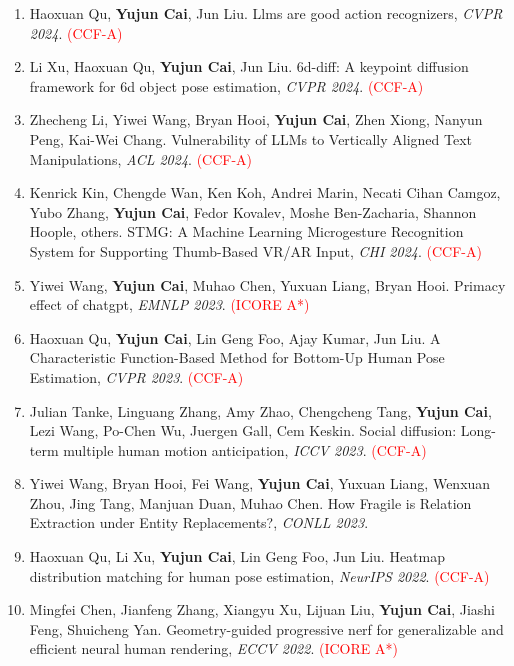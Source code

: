 \documentclass[11pt,letterpaper]{article}
\begin{document}
\begin{enumerate}
\item Haoxuan Qu, \textbf{Yujun Cai}, Jun Liu. Llms are good action recognizers, \textit{CVPR 2024}. \textcolor{red}{(CCF-A)}

\item Li Xu, Haoxuan Qu, \textbf{Yujun Cai}, Jun Liu. 6d-diff: A keypoint diffusion framework for 6d object pose estimation, \textit{CVPR 2024}. \textcolor{red}{(CCF-A)}

\item Zhecheng Li, Yiwei Wang, Bryan Hooi, \textbf{Yujun Cai}, Zhen Xiong, Nanyun Peng, Kai-Wei Chang. Vulnerability of LLMs to Vertically Aligned Text Manipulations, \textit{ACL 2024}. \textcolor{red}{(CCF-A)}

\item Kenrick Kin, Chengde Wan, Ken Koh, Andrei Marin, Necati Cihan Camgoz, Yubo Zhang, \textbf{Yujun Cai}, Fedor Kovalev, Moshe Ben-Zacharia, Shannon Hoople, others. STMG: A Machine Learning Microgesture Recognition System for Supporting Thumb-Based VR/AR Input, \textit{CHI 2024}. \textcolor{red}{(CCF-A)}

\item Yiwei Wang, \textbf{Yujun Cai}, Muhao Chen, Yuxuan Liang, Bryan Hooi. Primacy effect of chatgpt, \textit{EMNLP 2023}. \textcolor{red}{(ICORE A*)}

\item Haoxuan Qu, \textbf{Yujun Cai}, Lin Geng Foo, Ajay Kumar, Jun Liu. A Characteristic Function-Based Method for Bottom-Up Human Pose Estimation, \textit{CVPR 2023}. \textcolor{red}{(CCF-A)}

\item Julian Tanke, Linguang Zhang, Amy Zhao, Chengcheng Tang, \textbf{Yujun Cai}, Lezi Wang, Po-Chen Wu, Juergen Gall, Cem Keskin. Social diffusion: Long-term multiple human motion anticipation, \textit{ICCV 2023}. \textcolor{red}{(CCF-A)}

\item Yiwei Wang, Bryan Hooi, Fei Wang, \textbf{Yujun Cai}, Yuxuan Liang, Wenxuan Zhou, Jing Tang, Manjuan Duan, Muhao Chen. How Fragile is Relation Extraction under Entity Replacements?, \textit{CONLL 2023}.

\item Haoxuan Qu, Li Xu, \textbf{Yujun Cai}, Lin Geng Foo, Jun Liu. Heatmap distribution matching for human pose estimation, \textit{NeurIPS 2022}. \textcolor{red}{(CCF-A)}

\item Mingfei Chen, Jianfeng Zhang, Xiangyu Xu, Lijuan Liu, \textbf{Yujun Cai}, Jiashi Feng, Shuicheng Yan. Geometry-guided progressive nerf for generalizable and efficient neural human rendering, \textit{ECCV 2022}. \textcolor{red}{(ICORE A*)}


\end{enumerate}
\end{document}
